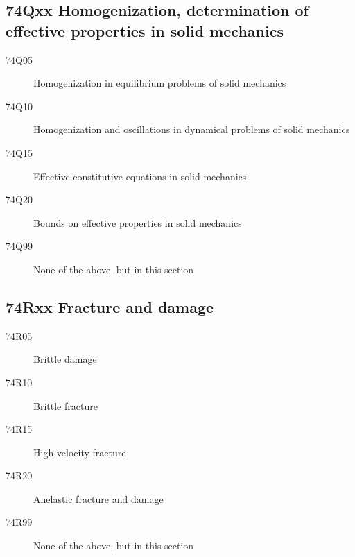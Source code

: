 \documentclass[letterpaper]{article}
\begin{document}
\subsection*{74Qxx  Homogenization, determination of effective properties in solid mechanics }\label{74Qxx}
\begin{description}  
\item [74Q05]\label{74Q05} Homogenization in equilibrium problems of solid mechanics
\item [74Q10]\label{74Q10} Homogenization and oscillations in dynamical problems  of solid mechanics
\item [74Q15]\label{74Q15} Effective constitutive equations  in solid mechanics
\item [74Q20]\label{74Q20} Bounds on effective properties  in solid mechanics
\item [74Q99]\label{74Q99} None of the above, but in this section
\end{description}
\subsection*{74Rxx  Fracture and damage }\label{74Rxx}
\begin{description}  
\item [74R05]\label{74R05} Brittle damage
\item [74R10]\label{74R10} Brittle fracture
\item [74R15]\label{74R15} High-velocity fracture
\item [74R20]\label{74R20} Anelastic fracture and damage
\item [74R99]\label{74R99} None of the above, but in this section
\end{description}
\end{document}
